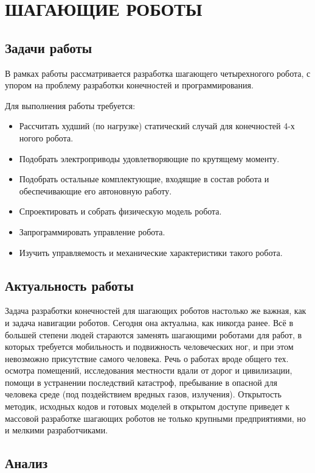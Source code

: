 \chapter{\MakeUppercase{Шагающие роботы}}

\section{Задачи работы}

В рамках работы рассматривается разработка шагающего четырехногого робота, с упором на проблему разработки конечностей и программирования.

Для выполнения работы требуется:
\begin{itemize}
    \item Рассчитать худший (по нагрузке) статический случай для конечностей 4-х ногого робота.
    \item Подобрать электроприводы удовлетворяющие по крутящему моменту.
    \item Подобрать остальные комплектующие, входящие в состав робота и обеспечивающие его автоновную работу.
    \item Спроектировать и собрать физическую модель робота.
    \item Запрограммировать управление робота.
    \item Изучить управляемость и механические характеристики такого робота.
\end{itemize}

\section{Актуальность работы}

Задача разработки конечностей для шагающих роботов настолько же важная, как и задача навигации роботов. Сегодня она актуальна, как никогда ранее. Всё в большей степени людей стараются заменять шагающими роботами для работ, в которых требуется мобильность и подвижность человеческих ног, и при этом невозможно присутствие самого человека. Речь о работах вроде общего тех. осмотра помещений, исследования местности вдали от дорог и цивилизации, помощи в устранении последствий катастроф, пребывание в опасной для человека среде (под поздействием вредных газов, излучения). Открытость методик, исходных кодов и готовых моделей в открытом доступе приведет к массовой разработке шагающих роботов не только крупными предприятиями, но и мелкими разработчиками.

\section{Анализ}

